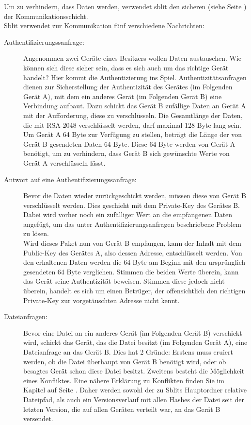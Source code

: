 Um zu verhindern, dass Daten werden, verwendet sblit den sicheren  (siehe Seite \pageref{Applicationchannel}) der Kommunikationsschicht.\\
Sblit verwendet zur Kommunikation fünf verschiedene Nachrichten:
\begin{description}
	\item [{Authentifizierungssanfrage:}]
		Angenommen zwei Geräte eines Besitzers wollen Daten austauschen. Wie können sich diese sicher sein, dass es sich auch um das richtige Gerät handelt? Hier kommt die Authentizierung ins Spiel. Authentizitätsanfragen dienen zur Sicherstellung der Authentizität des Gerätes (im 	Folgenden Gerät A), mit dem ein anderes Gerät (im Folgenden Gerät B) eine Verbindung aufbaut. Dazu schickt das Gerät B zufällige Daten an Gerät A mit der Aufforderung, diese zu verschlüsseln. Die Gesamtlänge der Daten, die mit RSA-2048 verschlüsselt werden, darf maximal 128 Byte lang sein. Um Gerät A 64 Byte zur Verfügung zu stellen, beträgt die Länge der von Gerät B gesendeten Daten 64 Byte. Diese 64 Byte werden von Gerät A benötigt, um zu verhindern, dass Gerät B sich gewünschte Werte von Gerät A verschlüsseln lässt.

	\item [{Antwort auf eine Authentifizierungssanfrage:}]
		Bevor die Daten wieder zurückgeschickt werden, müssen diese von Gerät B verschlüsselt werden. Dies geschieht mit dem Private-Key des Gerätes B. Dabei wird vorher noch ein zufälliger Wert an die empfangenen Daten angefügt, um das unter Authentifizierungsanfragen beschriebene Problem zu lösen.\\
		Wird dieses Paket nun von Gerät B empfangen, kann der Inhalt mit dem Public-Key des Gerätes A, also dessen Adresse, entschlüsselt werden. Von den erhaltenen Daten werden die 64 Byte am Beginn mit den ursprünglich gesendeten 64 Byte verglichen. Stimmen die beiden Werte überein, kann das Gerät seine Authentizität beweisen. Stimmen diese jedoch nicht überein, handelt es sich um einen Betrüger, der offensichtlich den richtigen Private-Key zur vorgetäuschten Adresse nicht kennt.
		
	\item [{Dateianfragen:}]\label{Dateianfragen}
		Bevor eine Datei an ein anderes Gerät (im Folgenden Gerät B) verschickt wird, schickt das Gerät, das die Datei besitzt (im Folgenden Gerät A), eine Dateianfrage an das Gerät B. Dies hat 2 Gründe: Erstens muss eruiert werden, ob die Datei überhaupt von Gerät B benötigt wird, oder ob besagtes Gerät schon diese Datei besitzt. Zweitens besteht die Möglichkeit eines Konfliktes. Eine nähere Erklärung zu Konflikten finden Sie im Kapitel  auf Seite \pageref{Konflikt}. Daher werden sowohl der zu Sblits Hauptordner relative Dateipfad, als auch ein Versionsverlauf mit allen Hashes der Datei seit der letzten Version, die auf allen Geräten verteilt war, an das Gerät B versendet. 
		

\end{description}
